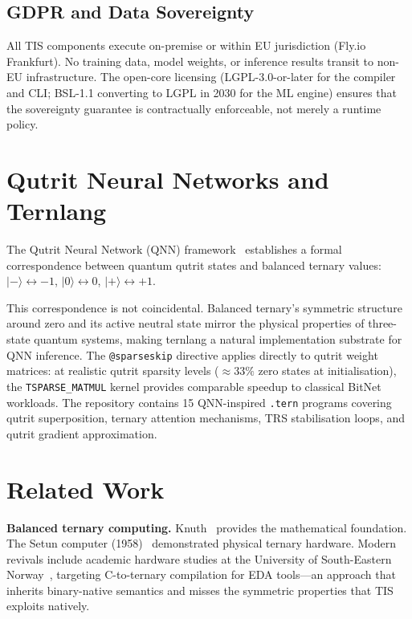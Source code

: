 \documentclass[journal,10pt,twocolumn]{IEEEtran}
\begin{document}
\subsection{GDPR and Data Sovereignty}

All TIS components execute on-premise or within EU jurisdiction (Fly.io
Frankfurt). No training data, model weights, or inference results transit
to non-EU infrastructure. The open-core licensing (LGPL-3.0-or-later for
the compiler and CLI; BSL-1.1 converting to LGPL in 2030 for the ML engine)
ensures that the sovereignty guarantee is contractually enforceable, not
merely a runtime policy.

\section{Qutrit Neural Networks and Ternlang}
\label{sec:qnn}

The Qutrit Neural Network (QNN) framework~\cite{kepp2026qnn} establishes a
formal correspondence between quantum qutrit states and balanced ternary
values: $\lvert -\rangle \leftrightarrow -1$,\;
$\lvert 0\rangle \leftrightarrow 0$,\;
$\lvert +\rangle \leftrightarrow +1$.

This correspondence is not coincidental. Balanced ternary's symmetric
structure around zero and its active neutral state mirror the physical
properties of three-state quantum systems, making ternlang a natural
implementation substrate for QNN inference. The \texttt{@sparseskip}
directive applies directly to qutrit weight matrices: at realistic qutrit
sparsity levels ($\approx 33\%$ zero states at initialisation), the
\texttt{TSPARSE\_MATMUL} kernel provides comparable speedup to classical
BitNet workloads. The repository contains 15 QNN-inspired \texttt{.tern}
programs covering qutrit superposition, ternary attention mechanisms, TRS
stabilisation loops, and qutrit gradient approximation.

\section{Related Work}
\label{sec:related}

\textbf{Balanced ternary computing.} Knuth~\cite{knuth1997art} provides the
mathematical foundation. The Setun computer (1958)~\cite{brousentsov2002setun}
demonstrated physical ternary hardware. Modern revivals include academic
hardware studies at the University of South-Eastern
Norway~\cite{bos2020ternary}, targeting C-to-ternary compilation for EDA
tools---an approach that inherits binary-native semantics and misses the
symmetric properties that TIS exploits natively.
\end{document}

